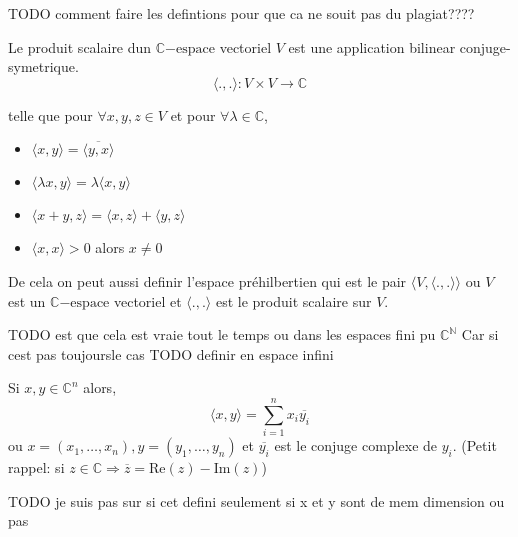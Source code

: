 TODO comment faire les defintions pour que ca ne souit pas du plagiat????
\begin{definition}[$l^2$]
    
\end{definition}

\begin{definition}
    Le produit scalaire dun $\mathbb{C}\mathrm{-espace}$ vectoriel $V$ est une application bilinear conjuge-symetrique. $$\langle ., . \rangle : V \times V \rightarrow \mathbb{C}$$

    telle que pour $ \forall x, y, z\in V$ et pour $\forall \lambda \in \mathbb{C}$,
    \begin{itemize}
        \item $\langle x, y \rangle = \overline{\langle y,x \rangle}$
        \item $\langle \lambda x, y \rangle = \lambda\langle x,y \rangle$
        \item $\langle x+y, z \rangle = \langle x,z \rangle + \langle y,z \rangle$
        \item $\langle x,x \rangle > 0 $ alors $x \neq 0 $
    \end{itemize}
    
    De cela on peut aussi definir l'espace préhilbertien qui est le pair $\langle V, \langle.,.\rangle \rangle$ ou $V$ est un $\mathbb{C}\mathrm{-espace}$ vectoriel et $\langle.,.\rangle$ est le produit scalaire sur $V$.
\end{definition}

TODO est que cela est vraie tout le temps ou dans les espaces fini pu $\mathbb{C}^\mathbb{N}$ Car si cest pas toujoursle cas TODO definir en espace infini

Si $x, y \in \mathbb{C}^n $ alors,
$$\langle x,y \rangle = \sum_{i=1}^{n} x_i \overline{y_i}$$
ou $x = (x_1, \ldots, x_n), y = (y_1, \ldots, y_n)$ et $\overline{y_i}$ est le conjuge complexe de $y_i$.  \newline (Petit rappel: si $z \in \mathbb{C} \Rightarrow \overline{z} = \mathrm{Re}(z) - \mathrm{Im}(z) $)

TODO je suis pas sur si cet defini seulement si x et y sont de mem dimension ou pas 
\begin{definition}
    
\end{definition}



\begin{definition}

\end{definition}

